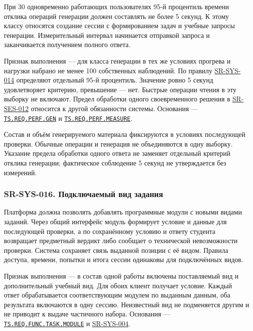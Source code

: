 \documentclass[12pt,a4paper]{article}
\begin{document}
\hypertarget{sr-sys-015-отклик-операций-генерации}{}

\hypertarget{sr-sys-015}{}

При 30 одновременно работающих пользователях 95-й процентиль времени отклика операций генерации должен составлять не более 5 секунд. К этому классу относятся создание сессии с формированием задач и учебные запросы генерации. Измерительный интервал начинается отправкой запроса и заканчивается получением полного ответа.

Признак выполнения --- для класса генерации в тех же условиях прогрева и нагрузки набрано не менее 100 собственных наблюдений. По правилу {\hyperlink{sr-sys-014}{SR-SYS-014}} определяют отдельный 95-й процентиль. Значение ровно 5 секунд удовлетворяет критерию, превышение --- нет. Быстрые операции чтения в эту выборку не включают. Предел обработки одного своевременного решения в {\hyperlink{sr-ses-012}{SR-SES-012}} относится к другой обязанности системы. Основания --- {\href{../02\_Техническое\_задание/DOC-02\_Техническое\_задание.pdf\#ts-req-perf-gen}{\texttt{TS.\allowbreak{}REQ.\allowbreak{}PERF.\allowbreak{}GEN}}} и {\href{../02\_Техническое\_задание/DOC-02\_Техническое\_задание.pdf\#ts-req-perf-measure}{\texttt{TS.\allowbreak{}REQ.\allowbreak{}PERF.\allowbreak{}MEASURE}}}.

Состав и объём генерируемого материала фиксируются в условиях последующей проверки. Обычные операции и генерация не объединяются в одну выборку. Указание предела обработки одного ответа не заменяет отдельный критерий отклика генерации; фактическое соблюдение 5 секунд не утверждается без измерений.

\subsubsection{SR-SYS-016. Подключаемый вид задания}\label{sr-sys-016-ux43fux43eux434ux43aux43bux44eux447ux430ux435ux43cux44bux439-ux432ux438ux434-ux437ux430ux434ux430ux43dux438ux44f}

\hypertarget{sr-sys-016-подключаемый-вид-задания}{}

\hypertarget{sr-sys-016}{}

Платформа должна позволять добавлять программные модули с новыми видами заданий. Через общий интерфейс модуль формирует условие и данные для последующей проверки, а по сохранённому условию и ответу студента возвращает предметный вердикт либо сообщает о технической невозможности проверки. Система сохраняет связь выданной позиции с её видом. Правила доступа, времени, попытки и итога сессии одинаковы для подключённых видов.

Признак выполнения --- в состав одной работы включены поставляемый вид и дополнительный учебный вид. Для обоих клиент получает условие. Каждый ответ обрабатывается соответствующим модулем по выданным данным, оба результата включаются в одну сессию. Неизвестный вид не подменяется другим и не приводит к выдаче частичного набора. Основания --- {\href{../02\_Техническое\_задание/DOC-02\_Техническое\_задание.pdf\#ts-req-func-task-module}{\texttt{TS.\allowbreak{}REQ.\allowbreak{}FUNC.\allowbreak{}TASK.\allowbreak{}MODULE}}} и {\hyperlink{sr-sys-004}{SR-SYS-004}}.
\end{document}
